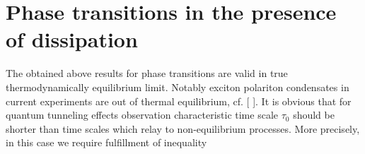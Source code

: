 \documentclass[aps, pre, preprint, groupedaddress, superscriptaddress, showkeys, showpacs] {revtex4-1}
\begin{document}
%
%
%
%
\section{Phase transitions in the presence of dissipation 
\label{sec:non-equilibrium}}

The obtained above results for phase transitions are valid in true thermodynamically equilibrium limit. Notably  exciton polariton condensates in current experiments are out of   thermal  equilibrium, cf. [   ].  
It is obvious that for quantum tunneling effects observation  characteristic time scale $\tau_0$ should be shorter than time scales which relay to non-equilibrium processes. More precisely, in this case we require fulfillment of  inequality 
 
\end{document}
